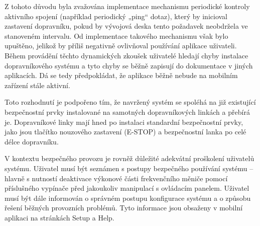 Z tohoto důvodu byla zvažována implementace mechanismu periodické kontroly aktivního spojení (například periodický „ping“ dotaz), který by inicioval zastavení dopravníku, pokud by vývojová deska tento požadavek neobdržela ve stanoveném intervalu. Od implementace takového mechanismu však bylo upuštěno, jelikož by příliš negativně ovlivňoval používání aplikace uživateli. Během provádění těchto dynamických zkoušek uživatelé hledají chyby instalace dopravníkového systému a tyto chyby se běžně zapisují do dokumentace v jiných aplikacích. Dá se tedy předpokládat, že aplikace běžně nebude na mobilním zařízení stále aktivní.

Toto rozhodnutí je podpořeno tím, že navržený systém se spoléhá na již existující bezpečnostní prvky instalované na samotných dopravníkových linkách a přebírá je. Dopravníkové linky mají hned po instalaci standardní bezpečnostní prvky, jako jsou tlačítko nouzového zastavení (E-STOP) a bezpečnostní lanka po celé délce dopravníku.

V kontextu bezpečného provozu je rovněž důležité adekvátní proškolení uživatelů systému. Uživatel musí být seznámen s postupy bezpečného používání systému – hlavně s nutností deaktivace výkonové části frekvenčního měniče pomocí příslušného vypínače před jakoukoliv manipulací s ovládacím panelem. Uživatel musí být dále informován o správném postupu konfigurace systému a o způsobu řešení běžných provozních problémů. Tyto informace jsou obsaženy v mobilní aplikaci na stránkách Setup a Help.